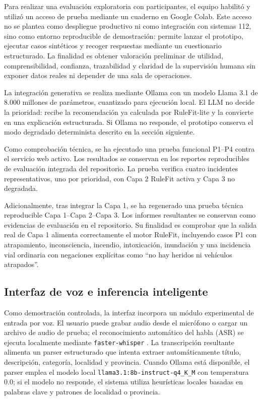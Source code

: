 Para realizar una evaluación exploratoria con participantes, el equipo habilitó
y utilizó un acceso de prueba mediante un cuaderno en Google Colab. Este acceso no se
plantea como despliegue productivo ni como integración con sistemas 112, sino como
entorno reproducible de demostración: permite lanzar el prototipo, ejecutar casos
sintéticos y recoger respuestas mediante un cuestionario estructurado. La finalidad es
obtener valoración preliminar de utilidad, comprensibilidad, confianza, trazabilidad y
claridad de la supervisión humana sin exponer datos reales ni depender de una sala de
operaciones.

La integración generativa se realiza mediante Ollama con un modelo Llama 3.1 de 8.000 millones de parámetros, cuantizado para ejecución local. El LLM no decide la prioridad: recibe la
recomendación ya calculada por RuleFit-lite y la convierte en una explicación
estructurada. Si Ollama no responde, el prototipo conserva el modo degradado
determinista descrito en la sección siguiente.

Como comprobación técnica, se ha ejecutado una prueba funcional P1--P4 contra el
servicio web activo. Los resultados se conservan en los reportes reproducibles de evaluación
integrada del repositorio. La prueba verifica cuatro incidentes representativos, uno por
prioridad, con Capa 2 RuleFit activa y Capa 3 no degradada.

Adicionalmente, tras integrar la Capa 1, se ha regenerado una prueba técnica reproducible
Capa 1--Capa 2--Capa 3. Los informes resultantes se conservan como evidencias de
evaluación en el repositorio. Su finalidad es comprobar que la salida real de Capa 1
alimenta correctamente el motor RuleFit, incluyendo casos P1 con atrapamiento,
inconsciencia, incendio, intoxicación, inundación y una incidencia vial ordinaria con
negaciones explícitas como ``no hay heridos ni vehículos atrapados''.

\subsection{Interfaz de voz e inferencia inteligente}

Como demostración controlada, la interfaz incorpora un módulo experimental de entrada
por voz. El usuario puede grabar audio desde el micrófono o cargar un archivo de audio
de prueba; el reconocimiento automático del habla (ASR) se ejecuta localmente mediante
\texttt{faster-whisper} \cite{FasterWhisper2026}. La transcripción
resultante alimenta un parser estructurado que intenta extraer automáticamente título,
descripción, categoría, localidad y provincia. Cuando Ollama está disponible, el parser
emplea el modelo local \texttt{llama3.1:8b-instruct-q4\_K\_M} con temperatura 0.0; si el
modelo no responde, el sistema utiliza heurísticas locales basadas en palabras clave y
patrones de localidad o provincia.

